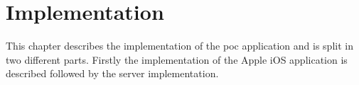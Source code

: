 \chapter{Implementation}\label{sec:impl}
This chapter describes the implementation of the \acrshort{poc} application and is split in two different parts.
Firstly the implementation of the Apple iOS application is described followed by the server implementation.




